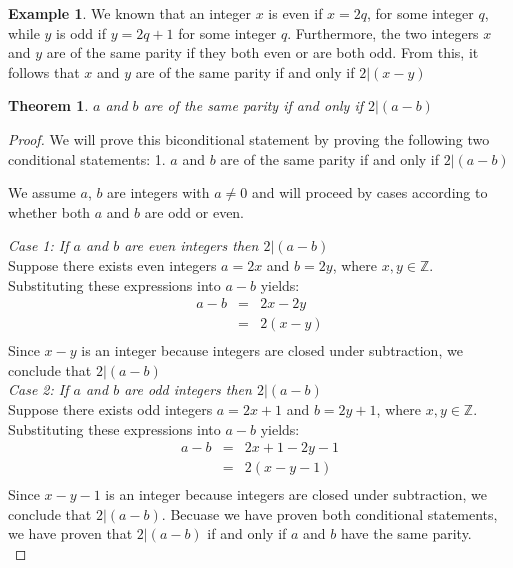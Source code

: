 \documentclass{book}
\newtheorem{theorem}{Theorem}[section]
\theoremstyle{definition}
\newtheorem{example}{Example}[definition]
\theoremstyle{remark}
\newcommand{\bb}[1]{\mathbb{#1}}
\begin{document}
\begin{example}
We known that an integer $x$ is even if $x = 2q$, for some integer $q$, while $y$ is odd if $y = 2q + 1$ for some integer $q$. Furthermore, the two integers $x$ and $y$ are of the same parity if they both even or are both odd. From this, it follows that $x$ and $y$ are of the same parity if and only if $2 | (x-y)$

\begin{tcolorbox}
	\begin{theorem}
		$a$ and $b$ are of the same parity if and only if $2 | (a - b)$
	\end{theorem}
\end{tcolorbox}

\begin{proof}
We will prove this biconditional statement by proving the following two conditional statements: 
1. $a$ and $b$ are of the same parity if and only if $2 | (a - b)$




We assume $a$, $b$ are integers with $a \neq 0$ and will proceed by cases according to whether both $a$ and $b$ are odd or even. 

{\it Case 1: If $a$ and $b$ are even integers then $2 | (a-b)$} \\
Suppose there exists even integers $a = 2x$ and $b = 2y$, where $x, y \in \bb{Z}$. Substituting these expressions into $a-b$ yields:
\begin{eqnarray*}
	a-b & = & 2x - 2y \nonumber \\	
	& = & 2(x-y) \nonumber \\
\end{eqnarray*}
Since $x-y$ is an integer because integers are closed under subtraction, we conclude that $2 | (a - b)$ \\


{\it Case 2: If $a$ and $b$ are odd integers then $2 | (a-b)$} \\
Suppose there exists odd integers $a = 2x + 1$ and $b = 2y + 1$, where $x, y \in \bb{Z}$. Substituting these expressions into $a-b$ yields:
\begin{eqnarray*}
	a-b & = & 2x + 1 - 2y - 1 \nonumber \\	
	& = & 2(x - y - 1) \nonumber \\
\end{eqnarray*}
Since $x-y-1$ is an integer because integers are closed under subtraction, we conclude that $2 | (a - b)$. Becuase we have proven both conditional statements, we have proven that $2 | (a-b)$ if and only if $a$ and $b$ have the same parity. \\
\end{proof}




\end{example}
\end{document}
